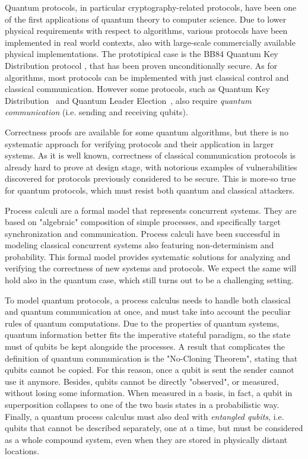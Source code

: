 Quantum protocols, in particular cryptography-related protocols, have been  one of the first applications of quantum theory to computer science. Due to lower physical
requirements with respect to algorithms, various protocols have been implemented
in real world contexts, also with large-scale commercially available physical implementations.
The prototipical case is the BB84 Quantum Key Distribution
protocol \cite{shor_simple_2000}, that has been proven unconditionally secure. As for algorithms, most protocols can be implemented with just classical control and classical communication. However some protocols, such as Quantum Key
Distribution~\cite{poppe_practical_2004} and Quantum Leader
Election~\cite{tani_exact_2012}, also require \textit{quantum communication} (i.e. sending and receiving qubits).


Correctness proofs are available for some quantum algorithms, but there is no systematic approach for verifying protocols and their application in larger systems.
As it is well known, correctness of classical communication protocols is already hard to prove at design stage, with notorious examples of vulnerabilities discovered for protocols previously considered to be secure. This is more-so true for quantum protocols, which must resist both quantum and classical attackers.


Process calculi are a formal model that represents concurrent systems. They are based on "algebraic" composition of simple processes, and specifically target synchronization and communication.
Process calculi have been successful in modeling classical concurrent systems also featuring non-determinism and probability. This formal model provides systematic solutions for analyzing and verifying the correctness of new systems and protocols. We expect the same will hold also in the quantum case, which still turns out to be a challenging setting.


To model quantum protocols, a process calculus needs to handle both classical and quantum communication at once, and must take into account the peculiar rules of quantum computations. Due to the properties of quantum systems, quantum information better fits the imperative stateful paradigm, so the state must of qubits be kept alongside the processes. A result that complicates the definition of quantum communication is the "No-Cloning Theorem", stating that qubits cannot be copied. For this reason, once a qubit is sent the sender cannot use it anymore.
Besides, qubits cannot be directly "observed", or measured, without losing some information. When measured in a basis, in fact, a qubit in superposition collapses to one of the two basis states in a probabilistic way.
Finally, a quantum process calculus must also deal with \textit{entangled qubits}, i.e. qubits that cannot be described separately, one at a time, but must be considered as a whole compound system, even when they are stored in physically distant locations.

